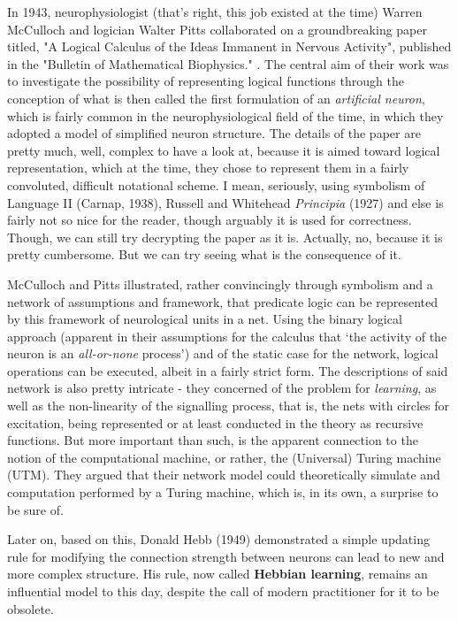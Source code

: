In 1943, neurophysiologist (that's right, this job existed at the time) Warren McCulloch and logician Walter Pitts collaborated on a groundbreaking paper titled, "A Logical Calculus of the Ideas Immanent in Nervous Activity", published in the "Bulletin of Mathematical Biophysics." \cite{mcculloch_logical_1943}. The central aim of their work was to investigate the possibility of representing logical functions through the conception of what is then called the first formulation of an \textit{artificial neuron}, which is fairly common in the neurophysiological field of the time, in which they adopted a model of simplified neuron structure. The details of the paper are pretty much, well, complex to have a look at, because it is aimed toward logical representation, which at the time, they chose to represent them in a fairly convoluted, difficult notational scheme. I mean, seriously, using symbolism of Language II (Carnap, 1938), Russell and Whitehead \textit{Principia} (1927) and else is fairly not so nice for the reader, though arguably it is used for correctness. Though, we can still try decrypting the paper as it is. Actually, no, because it is pretty cumbersome. But we can try seeing what is the consequence of it. 

McCulloch and Pitts illustrated, rather convincingly through symbolism and a network of assumptions and framework, that predicate logic can be represented by this framework of neurological units in a net. Using the binary logical approach (apparent in their assumptions for the calculus that `the activity of the neuron is an \textit{all-or-none} process') and of the static case for the network, logical operations can be executed, albeit in a fairly strict form. The descriptions of said network is also pretty intricate - they concerned of the problem for \textit{learning}, as well as the non-linearity of the signalling process, that is, the nets with circles for excitation, being represented or at least conducted in the theory as recursive functions. But more important than such, is the apparent connection to the notion of the computational machine, or rather, the (Universal) Turing machine (UTM). They argued that their network model could theoretically simulate and computation performed by a Turing machine, which is, in its own, a surprise to be sure of. 

Later on, based on this, Donald Hebb (1949) demonstrated a simple updating rule for modifying the connection strength between neurons can lead to new and more complex structure. His rule, now called \textbf{Hebbian learning}, remains an influential model to this day, despite the call of modern practitioner for it to be obsolete. 

